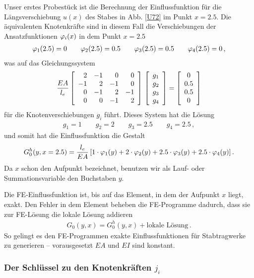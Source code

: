 Unser erstes Probest\"{u}ck ist die Berechnung der Einflussfunktion f\"{u}r die L\"{a}ngsverschiebung $u(x)$ des Stabes in Abb. \ref{U72} im Punkt $x = 2.5$. Die \"{a}quivalenten Knotenkr\"{a}fte sind in diesem Fall die Verschiebungen der Ansatzfunktionen $\Np_i(x)$ in dem Punkt $x = 2.5$
\begin{align}\label{Eq110}
\Np_1(2.5) = 0 \qquad \Np_2(2.5) = 0.5 \qquad \Np_3(2.5) = 0.5 \qquad \Np_4(2.5) = 0\,,
\end{align}
was auf  das Gleichungssystem
\begin{align}\label{Eq68}
\frac{EA}{l_e} \left[\barr{r r r r} 2 & - 1 & 0 & 0 \\ - 1 & 2 & -1 & 0\\ 0 & -1 & 2 &-1 \\ 0 & 0 & -1 &2\earr\right]
\,\left[\barr{c} g_1 \\g_2 \\ g_3 \\ g_4 \earr \right] = \left[\barr{c} 0 \\ 0.5  \\
0.5  \\ 0 \earr \right]
\end{align}
f\"{u}r die Knotenverschiebungen $g_i$ f\"{u}hrt. Dieses System  hat die L\"{o}sung
\begin{align}
g_1 = 1\qquad g_2 = 2\qquad g_3 = 2.5\qquad g_4 = 2.5\,,
\end{align}
und somit hat die Einflussfunktion die Gestalt
\begin{align}
G_0^h(y,x = 2.5) = \frac{l_e}{EA}\, [1 \cdot \Np_1(y) + 2 \cdot \Np_2(y) + 2.5 \cdot \Np_3(y) + 2.5 \cdot\Np_4(y)]\,.
\end{align}
Da $x$ schon den Aufpunkt bezeichnet, benutzen wir als Lauf- oder Summationsvariable den Buchstaben $y$.

Die FE-Einflussfunktion ist, bis auf das Element, in dem der Aufpunkt $x$ liegt, exakt.
Den Fehler in dem Element beheben die FE-Programme dadurch, dass sie zur FE-L\"{o}sung die lokale L\"{o}sung addieren
\begin{align}
G_0(y,x) = G_0^h(y,x) + \text{lokale L\"{o}sung}\,.
\end{align}
So gelingt es den FE-Programmen exakte Einflussfunktionen f\"{u}r Stabtragwerke zu generieren -- vorausgesetzt $EA$ und $EI$ sind konstant.\\

{\textcolor{sectionTitleBlue}{\subsubsection*{Der Schl\"{u}ssel zu den Knotenkr\"{a}ften $ j_i$}}}


